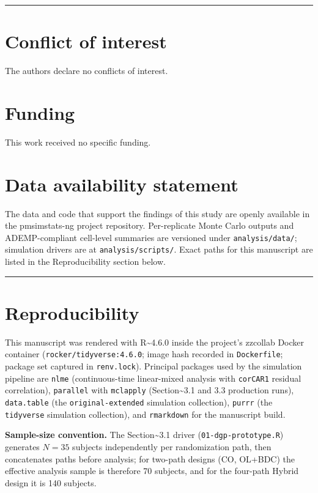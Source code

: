 \documentclass[
  11pt,
]{article}
\begin{document}
\bigskip\noindent

\rule{\textwidth}{0.4pt}\bigskip

\section{Conflict of interest}

The authors declare no conflicts of interest.

\section{Funding}

This work received no specific funding.

\section{Data availability statement}

The data and code that support the findings of this study are openly
available in the pmsimstats-ng project repository. Per-replicate Monte
Carlo outputs and ADEMP-compliant cell-level summaries are versioned
under \texttt{analysis/data/}; simulation drivers are at
\texttt{analysis/scripts/}. Exact paths for this manuscript are listed
in the Reproducibility section below.

\bigskip\noindent

\rule{\textwidth}{0.4pt}\bigskip

\section{Reproducibility}

This manuscript was rendered with R\textasciitilde4.6.0 inside the
project's zzcollab Docker container (\texttt{rocker/tidyverse:4.6.0};
image hash recorded in \texttt{Dockerfile}; package set captured in
\texttt{renv.lock}). Principal packages used by the simulation pipeline
are \texttt{nlme} (continuous-time linear-mixed analysis with
\texttt{corCAR1} residual correlation), \texttt{parallel} with
\texttt{mclapply} (Section\textasciitilde3.1 and 3.3 production runs),
\texttt{data.table} (the \texttt{original-extended} simulation
collection), \texttt{purrr} (the \texttt{tidyverse} simulation
collection), and \texttt{rmarkdown} for the manuscript build.

\textbf{Sample-size convention.} The Section\textasciitilde3.1 driver
(\texttt{01-dgp-prototype.R}) generates \(N = 35\) subjects
independently per randomization path, then concatenates paths before
analysis; for two-path designs (CO, OL+BDC) the effective analysis
sample is therefore 70 subjects, and for the four-path Hybrid design it
is 140 subjects.
\end{document}
